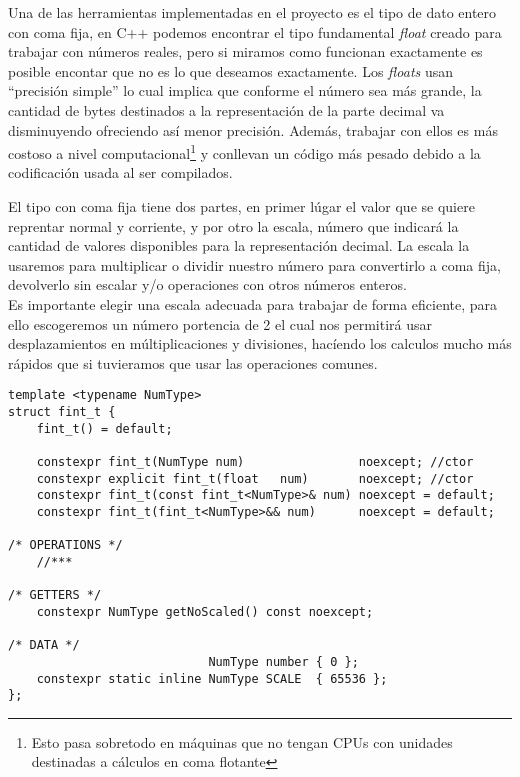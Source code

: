 Una de las herramientas implementadas en el proyecto es el tipo de dato entero con coma fija,
en C++ podemos encontrar el tipo fundamental \textit{float} creado para trabajar con números 
reales, pero si miramos como funcionan exactamente es posible encontar que no es lo que deseamos
exactamente. Los \textit{floats} usan ``precisión simple'' lo cual implica que conforme el número 
sea más grande, la cantidad de bytes destinados a la representación de la parte decimal va 
disminuyendo ofreciendo así menor precisión. Además, trabajar con ellos es más costoso a nivel
computacional\footnote{Esto pasa sobretodo en máquinas que no tengan CPUs con unidades destinadas 
a cálculos en coma flotante} y conllevan un código más pesado debido a la codificación usada 
al ser compilados.

El tipo con coma fija tiene dos partes, en primer lúgar el valor que se quiere reprentar normal
y corriente, y por otro la escala, número que indicará la cantidad de valores disponibles
para la representación decimal. La escala la usaremos para multiplicar o dividir nuestro número
para convertirlo a coma fija, devolverlo sin escalar y/o operaciones con otros números enteros.\\
Es importante elegir una escala adecuada para trabajar de forma eficiente, para ello escogeremos
un número portencia de 2 el cual nos permitirá usar desplazamientos en múltiplicaciones y divisiones,
hacíendo los calculos mucho más rápidos que si tuvieramos que usar las operaciones comunes.

\newpage

\begin{lstlisting}[style=CodigoC++, caption={Entero coma fija},label=fint_t]
template <typename NumType>
struct fint_t {
    fint_t() = default;

    constexpr fint_t(NumType num)                noexcept; //ctor
    constexpr explicit fint_t(float   num)       noexcept; //ctor
    constexpr fint_t(const fint_t<NumType>& num) noexcept = default; 
    constexpr fint_t(fint_t<NumType>&& num)      noexcept = default;

/* OPERATIONS */
	//***

/* GETTERS */
    constexpr NumType getNoScaled() const noexcept;
    
/* DATA */    
                            NumType number { 0 };
    constexpr static inline NumType SCALE  { 65536 };
};
\end{lstlisting}



